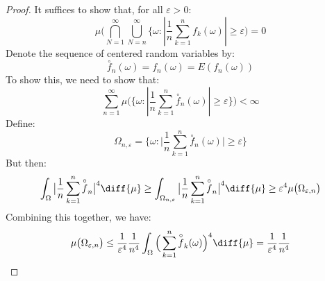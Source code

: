             \begin{proof}
                It suffices to show that, for all $\varepsilon>0$:
                \begin{equation}
                    \mu\Big(\bigcap_{N=1}^{\infty}
                        \bigcup_{N=n}^{\infty}
                        \big\{\omega:|\frac{1}{n}\sum_{k=1}^{n}
                            f_{k}(\omega)|\geq\varepsilon\Big)=0
                \end{equation}
                Denote the sequence of centered random variables by:
                \begin{equation}
                    \overset{\circ}{f}_{n}(\omega)=
                    f_{n}(\omega)=E(f_{n}(\omega))
                \end{equation}
                To show this, we need to show that:
                \begin{equation}
                    \sum_{n=1}^{\infty}\mu\Big(
                        \big\{\omega:|\frac{1}{n}\sum_{k=1}^{n}
                            \overset{\circ}{f}_{n}(\omega)|
                            \geq\varepsilon\big\}\Big)<\infty
                \end{equation}
                Define:
                \begin{equation}
                    \Omega_{n,\varepsilon}=
                    \Big\{\omega:\big|\frac{1}{n}\sum_{k=1}^{n}
                        \overset{\circ}{f}_{n}(\omega)\big|
                        \geq\varepsilon\Big\}
                \end{equation}
                But then:
                \begin{equation}
                    \int_{\Omega}\big|\frac{1}{n}\sum_{k=1}^{n}
                        \overset{\circ}{f}_{n}\big|^{4}\diff{\mu}
                    \geq\int_{\Omega_{n,\varepsilon}}
                    \big|\frac{1}{n}\sum_{k=1}^{n}
                        \overset{\circ}{f}_{n}\big|^{4}\diff{\mu}
                    \geq\varepsilon^{4}
                        \mu\big(\Omega_{\varepsilon,n}\big)
                \end{equation}
                Combining this together, we have:
                \begin{equation}
                    \mu\big(\Omega_{\varepsilon,n}\big)
                    \leq\frac{1}{\varepsilon^{4}}\frac{1}{n^{4}}
                    \int_{\Omega}\Big(\sum_{k=1}^{n}
                    \overset{\circ}{f}_{k}(\omega)\Big)^{4}\diff{\mu}
                    =\frac{1}{\varepsilon^{4}}\frac{1}{n^{4}}

\end{equation}
\end{proof}
